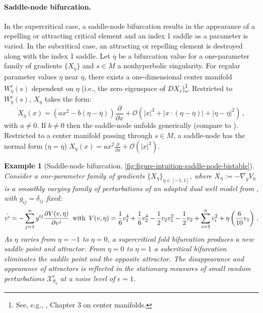 \documentclass[12pt]{article}
\newtheorem{example}{Example}
\newcommand\colorAutoref[1]{{\hypersetup{linkcolor=blue}\autoref{#1}}}  %
\begin{document}
\paragraph{Saddle-node bifurcation.}
In the supercritical case, a saddle-node bifurcation results in the appearance of a repelling or attracting critical element and an index 1 saddle as a parameter is varied. In the subcritical case, an attracting or repelling element is destroyed along with the index 1 saddle. Let $\overline{\eta}$ be a bifurcation value for a one-parameter family of gradients $\{X_{\eta}\}$ and $s \in M$ a nonhyperbolic singularity. For regular parameter values $\eta$ near $\overline{\eta}$, there exists a one-dimensional center manifold $W_{\eta}^c(s)$ dependent on $\eta$ (i.e., the zero eigenspace of $DX_s$)\footnote{See, e.g., \cite{guckenheimer2013nonlinear}, Chapter 3 on center manifolds.}. Restricted to $W_{\eta}^c(s)$, $X_{\eta}$ takes the form:
\begin{equation*}
    X_{\eta}(x) = \left( ax^2 - b(\eta - \overline{\eta}) \right) \frac{\partial}{\partial x} + \mathcal{O}\left( |x|^3 + |x \cdot (\eta - \overline{\eta})| + |\eta-\overline{\eta}|^2 \right) \, ,
\end{equation*}
with $a\neq 0$. If $b \neq 0$ then the saddle-node unfolds generically (compare to ). Restricted to a center manifold passing through $s\in M$, a saddle-node has the normal form ($\eta=\overline{\eta}$) ${X_{\overline{\eta}}(x) = ax^2 \frac{\partial}{\partial x} + \mathcal{O}\left( |x|^3 \right)}$.

\begin{example}[Saddle-node bifurcation, \colorAutoref{fig:figure-intuition-saddle-node-bistable}]
\label{example:saddle-node}
Consider a one-parameter family of gradients $\{ X_{\eta} \}_{\eta\in [-1,1]}$, where $X_{\eta} := -\nabla_{g} V_{\eta}$ is a smoothly varying family of perturbations of an adapted dual well model from , with $g_{ij}=\delta_{ij}$ fixed:
\begin{equation*}
\label{equation:example-saddle-node-associative-memory-dual-well}
    {\dot{v^i}} = - \sum_{j=1}^{n} g^{ij} \frac{\partial V(v, \eta)}{\partial v^j} \hspace{0.5em} 
    \mathrm{with} \hspace{0.5em}  V(v, \eta) = \dfrac{1}{6} v_{1}^{4} + \dfrac{1}{6} v_{2}^{4} - \dfrac{1}{2}v_{2}v_{1}^{2} - \dfrac{1}{2}v_{2} + \sum_{i=3}^{n}v_{i}^{2} + \eta\left(\dfrac{6}{10}v_1\right) \, .
\end{equation*}
As $\eta$ varies from $\eta=-1$ to $\eta=0$, a supercritical fold bifurcation produces a new saddle point and attractor. From $\eta=0$ to $\eta=1$ a subcritical bifurcation eliminates the saddle point and the opposite attractor. The disappearance and appearance of attractors is reflected in the stationary measures of small random perturbations $\mathcal{X}^{\epsilon}_{\theta_{\eta}}$ at a noise level of $\epsilon=1$. 
\end{example}
\end{document}
